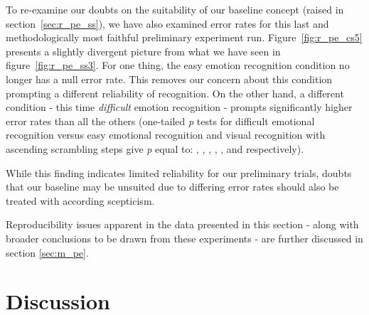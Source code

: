 	    To re-examine our doubts on the suitability of our baseline concept (raised in section~\ref{sec:r_pe_ss}), we have also examined error rates for this last and methodologically most faithful preliminary experiment run.
	    Figure~\ref{fig:r_pe_cs5} presents a slightly divergent picture from what we have seen in figure~\ref{fig:r_pe_ss3}.
	    For one thing, the easy emotion recognition condition no longer has a null error rate.
	    This removes our concern about this condition prompting a different reliability of recognition.
	    On the other hand, a different condition - this time \textit{difficult} emotion recognition - prompts significantly higher error rates than all the others
	    (one-tailed \textit{p} tests for difficult emotional recognition versus easy emotional recognition and visual recognition with ascending scrambling steps give \textit{p} equal to:
	    ,
	    ,
	    ,
	    ,
	    , and
	    respectively).
	    
	    While this finding indicates limited reliability for our preliminary trials, doubts that our baseline may be unsuited due to differing error rates should also be treated with according scepticism.
	    
	    Reproducibility issues apparent in the data presented in this section - along with broader conclusions to be drawn from these experiments - are further discussed in section \ref{sec:m_pe}. 
\chapter{Discussion}
